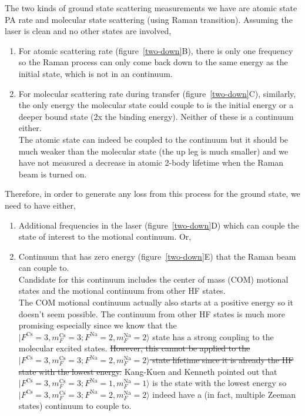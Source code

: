 \documentclass[10pt,fleqn]{article}
\begin{document}
The two kinds of ground state scattering measurements we have are atomic state PA rate
and molecular state scattering (using Raman transition).
Assuming the laser is clean and no other states are involved,
\begin{enumerate}
\item For atomic scattering rate (\mbox{figure \ref{two-down}B}), there is only
  one frequency so the Raman process can only come back down to the same energy as
  the initial state, which is not in an continuum.
\item For molecular scattering rate during transfer (\mbox{figure \ref{two-down}C}),
  similarly, the only energy the molecular state could couple to is the initial energy
  or a deeper bound state (2x the binding energy). Neither of these is a continuum either.\\
  The atomic state can indeed be coupled to the continuum but it should be much weaker than
  the molecular state (the up leg is much smaller) and we have not measured a decrease in
  atomic 2-body lifetime when the Raman beam is turned on.
\end{enumerate}
Therefore, in order to generate any loss from this process for the ground state,
we need to have either,
\begin{enumerate}
\item Additional frequencies in the laser (\mbox{figure \ref{two-down}D}) which
  can couple the state of interest to the motional continuum. Or,
\item Continuum that has zero energy (\mbox{figure \ref{two-down}E}) that the Raman beam
  can couple to.\\
  Candidate for this continuum includes the center of mass (COM) motional states and
  the motional continuum from other HF states.\\
  The COM motional continuum actually also starts at a positive energy so it doesn't seem
  possible. The continuum from other HF states is much more promising especially since
  we know that the $|F^{\mathrm{Cs}}\!=\!3, m_{F}^{\mathrm{Cs}}\!=\!3; F^{\mathrm{Na}}\!=\!2, m_{F}^{\mathrm{Na}}\!=\!2\rangle$ state has a strong coupling to the molecular excited states.
  \sout{However, this cannot be applied to the $|F^{\mathrm{Cs}}\!=\!3, m_{F}^{\mathrm{Cs}}\!=\!3; F^{\mathrm{Na}}\!=\!2, m_{F}^{\mathrm{Na}}\!=\!2\rangle$ state lifetime since it is already
    the HF state with the lowest energy.}
  Kang-Kuen and Kenneth pointed out that $|F^{\mathrm{Cs}}\!=\!3, m_{F}^{\mathrm{Cs}}\!=\!3; F^{\mathrm{Na}}\!=\!1, m_{F}^{\mathrm{Na}}\!=\!1\rangle$ is the state with the lowest energy
  so $|F^{\mathrm{Cs}}\!=\!3, m_{F}^{\mathrm{Cs}}\!=\!3; F^{\mathrm{Na}}\!=\!2, m_{F}^{\mathrm{Na}}\!=\!2\rangle$ indeed have a (in fact, multiple Zeeman states) continuum to couple to.
\end{enumerate}
\end{document}
